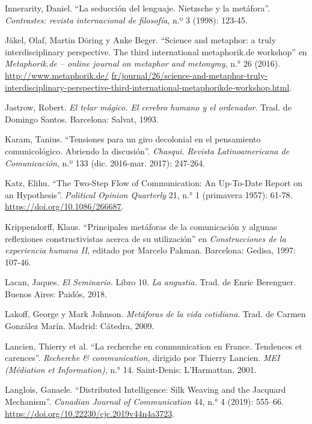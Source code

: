 \documentclass{tufte-handout}
\begin{document}
\begin{hangparas}{.25in}{1}
Innerarity, Daniel. ``La seducción del lenguaje. Nietzsche y la
metáfora''. \emph{Contrastes: revista internacional de filosofía}, n.º 3
(1998): 123-45.

Jäkel, Olaf, Martin Döring y Anke Beger. ``Science and metaphor: a truly
interdisciplinary perspective. The third international metaphorik.de
workshop'' en \emph{Metaphorik.de -- online journal on metaphor and
metonymy}, n.° 26 (2016).
\href{http://www.metaphorik.de/fr/journal/26/science-and-metaphor-truly-interdisciplinary-perspective-third-international-metaphorikde-workshop.html}{http://www.metaphorik.de/} \href{http://www.metaphorik.de/fr/journal/26/science-and-metaphor-truly-interdisciplinary-perspective-third-international-metaphorikde-workshop.html}{fr/journal/26/science-and-metaphor-truly-interdisciplinary-perspective-third-international-metaphorikde-workshop.html}.

Jastrow, Robert. \emph{El telar mágico. El cerebro humano y el
ordenador}. Trad. de Domingo Santos. Barcelona: Salvat, 1993.

Karam, Tanius. ``Tensiones para un giro decolonial en el pensamiento
comunicológico. Abriendo la discusión''. \emph{Chasqui. Revista
Latinoamericana de Comunicación}, n.º 133 (dic. 2016-mar. 2017):
247-264.

Katz, Elihu. ``The Two-Step Flow of Communication: An Up-To-Date Report
on an Hypothesis''. \emph{Political Opinion Quarterly} 21, n.° 1
(primavera 1957): 61-78. \url{https://doi.org/10.1086/266687}.

Krippendorff, Klaus. ``Principales metáforas de la comunicación y
algunas reflexiones constructivistas acerca de su utilización'' en
\emph{Construcciones de la experiencia humana II}, editado por Marcelo
Pakman. Barcelona: Gedisa, 1997: 107-46.

Lacan, Jaques. \emph{El Seminario.} Libro 10. \emph{La angustia}. Trad.
de Enric Berenguer. Buenos Aires: Paidós, 2018.

Lakoff, George y Mark Johnson. \emph{Metáforas de la vida cotidiana}.
Trad. de Carmen González Marín. Madrid: Cátedra, 2009.

Lancien, Thierry et al. ``La recherche en communication en France.
Tendences et carences''. \emph{Recherche \& communication}, dirigido por
Thierry Lancien. \emph{MEI} \emph{(Médiation et Information)}, n.° 14.
Saint-Denis: L'Harmattan, 2001.

Langlois, Ganaele. ``Distributed Intelligence: Silk Weaving and the
Jacquard Mechanism''. \emph{Canadian Journal of Communication} 44, n.° 4
(2019): 555--66. \url{https://doi.org/10.22230/cjc.2019v44n4a3723}.


\end{hangparas}
\end{document}
